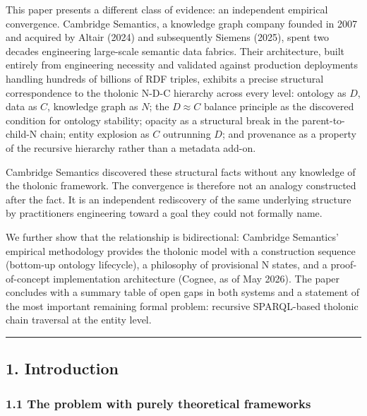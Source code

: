 \documentclass[
  11pt,
  letterpaper,
]{article}
\begin{document}
This paper presents a different class of evidence: an independent
empirical convergence. Cambridge Semantics, a knowledge graph company
founded in 2007 and acquired by Altair (2024) and subsequently Siemens
(2025), spent two decades engineering large-scale semantic data fabrics.
Their architecture, built entirely from engineering necessity and
validated against production deployments handling hundreds of billions
of RDF triples, exhibits a precise structural correspondence to the
tholonic N-D-C hierarchy across every level: ontology as \(D\), data as
\(C\), knowledge graph as \(N\); the \(D \approx C\) balance principle
as the discovered condition for ontology stability; opacity as a
structural break in the parent-to-child-N chain; entity explosion as
\(C\) outrunning \(D\); and provenance as a property of the recursive
hierarchy rather than a metadata add-on.

Cambridge Semantics discovered these structural facts without any
knowledge of the tholonic framework. The convergence is therefore not an
analogy constructed after the fact. It is an independent rediscovery of
the same underlying structure by practitioners engineering toward a goal
they could not formally name.

We further show that the relationship is bidirectional: Cambridge
Semantics' empirical methodology provides the tholonic model with a
construction sequence (bottom-up ontology lifecycle), a philosophy of
provisional N states, and a proof-of-concept implementation architecture
(Cognee, as of May 2026). The paper concludes with a summary table of
open gaps in both systems and a statement of the most important
remaining formal problem: recursive SPARQL-based tholonic chain
traversal at the entity level.

\begin{center}\rule{0.5\linewidth}{0.5pt}\end{center}

\subsection{1. Introduction}\label{introduction}

\subsubsection{1.1 The problem with purely theoretical
frameworks}\label{the-problem-with-purely-theoretical-frameworks}
\end{document}
